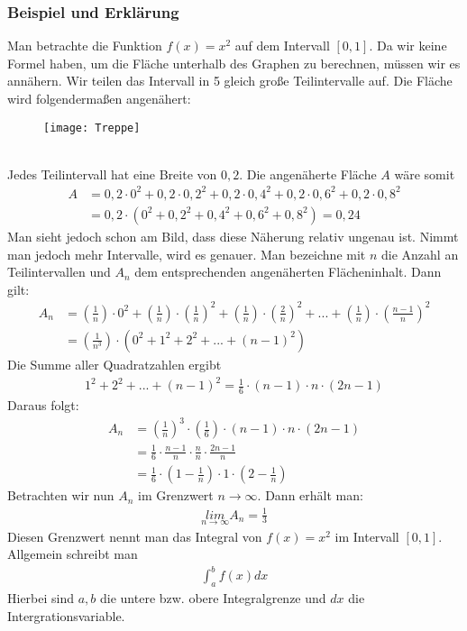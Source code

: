 \documentclass[a4paper]{article}
\begin{document}
\subsubsection{Beispiel und Erklärung}
Man betrachte die Funktion $f(x) = x^2$ auf dem Intervall $[0,1]$. Da wir keine Formel haben, um die Fläche unterhalb des Graphen zu berechnen, müssen wir es annähern. Wir teilen das Intervall in 5 gleich große Teilintervalle auf. Die Fläche wird folgendermaßen angenähert:
\vspace{1em } \\
\begin{figure} [h!]
\centering
\texttt{[image: Treppe]}
\end{figure}
\vspace{1 em} \\
Jedes Teilintervall hat eine Breite von $0,2$. Die angenäherte Fläche $A$ wäre somit
\begin{align*}
A &= 0,2 \cdot 0^2 + 0,2 \cdot 0,2^2 + 0,2 \cdot 0,4^2 + 0,2 \cdot 0,6^2 + 0,2 \cdot 0,8^2 \\
&= 0,2 \cdot (0^2 + 0,2^2 + 0,4^2 + 0,6^2 + 0,8^2) = 0,24
\end{align*}
Man sieht jedoch schon am Bild, dass diese Näherung relativ ungenau ist. Nimmt man jedoch mehr Intervalle, wird es genauer. Man bezeichne mit $n$ die Anzahl an Teilintervallen und $A_n$ dem entsprechenden angenäherten Flächeninhalt. Dann gilt:
\begin{align*}
A_n &= \left( \frac{1}{n} \right) \cdot 0^2 + \left( \frac{1}{n} \right) \cdot  \left( \frac{1}{n} \right)^2 +  \left( \frac{1}{n} \right) \cdot  \left( \frac{2}{n} \right)^2 + ... +  \left( \frac{1}{n} \right)  \cdot  \left( \frac{n-1}{n} \right)^2 \\
&=  \left( \frac{1}{n^3} \right) \cdot (0^2 + 1^2 + 2^2 + ... + (n-1)^2)
\end{align*}
Die Summe aller Quadratzahlen ergibt 
\begin{align*}
1^2 + 2^2 + ... + (n-1)^2 = \frac{1}{6} \cdot (n-1) \cdot n \cdot (2n-1)
\end{align*}
Daraus folgt:
\begin{align*}
A_n &=  \left( \frac{1}{n} \right)^3 \cdot  \left( \frac{1}{6} \right) \cdot (n-1) \cdot n \cdot (2n-1) \\
&= \frac{1}{6} \cdot \frac{n-1}{n} \cdot \frac{n}{n} \cdot \frac{2n-1}{n} \\
&= \frac{1}{6} \cdot \left( 1 - \frac{1}{n} \right) \cdot 1 \cdot \left( 2 - \frac{1}{n} \right) 
\end{align*}
Betrachten wir nun $A_n$ im Grenzwert $n \rightarrow \infty$. Dann erhält man:
\begin{align*}
\underset {n \rightarrow \infty}{lim} A_n = \frac{1}{3}
\end{align*}
Diesen Grenzwert nennt man das Integral von $f(x) = x^2$ im Intervall $[0,1]$. Allgemein schreibt man
\begin{align*}
\int_a^b f(x) dx
\end{align*}
Hierbei sind $a,b$ die untere bzw. obere Integralgrenze und $dx$ die Intergrationsvariable.
\end{document}
